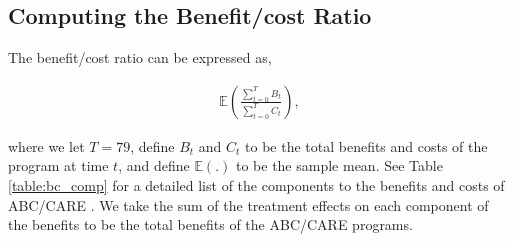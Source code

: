 

\subsection{Computing the Benefit/cost Ratio}
\label{app:method_cbratio}

\noindent The benefit/cost ratio can be expressed as,

\begin{align}
\mathbb{E} \left( \frac{ \sum_{t=0}^T B_t}{\sum_{t=0}^T C_t} \right),
\end{align}

\noindent where we let $T = 79$, define $B_t$ and $C_t$ to be the total benefits and costs of the
program at time $t$, and define $\mathbb{E}(.)$ to be the sample mean. See Table \ref{table:bc_comp} for a detailed list of the components
to the benefits and costs of ABC/CARE . We take the sum of the treatment effects on each component
of the benefits to be the total benefits of the ABC/CARE programs. \\

